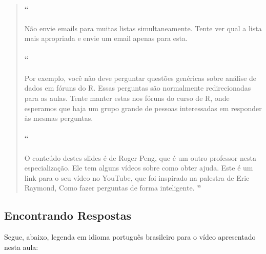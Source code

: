 \begin{quotation}
\begin{small}
\paragraph{``}
Não envie emails para muitas listas simultaneamente. Tente ver qual a lista mais apropriada e envie um email apenas para esta.

\paragraph{``}
Por exemplo, você não deve perguntar questões genéricas sobre análise de dados em fóruns do R. Essas perguntas são normalmente redirecionadas para as aulas. Tente manter estas nos fóruns do curso de R, onde esperamos que haja um grupo grande de pessoas interessadas em responder às mesmas perguntas.

\paragraph{``}
O conteúdo destes slides é de Roger Peng, que é um outro professor nesta especialização. Ele tem alguns vídeos sobre como obter ajuda. Este é um link para o seu vídeo no YouTube, que foi inspirado na palestra de Eric Raymond, Como fazer perguntas de forma inteligente.
{\large\textbf{''}}
\end{small}
\end{quotation}


\subsection{Encontrando Respostas}

Segue, abaixo, legenda em idioma português brasileiro para o vídeo apresentado nesta aula:

